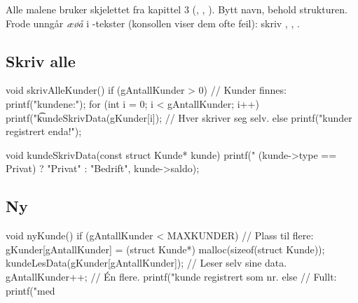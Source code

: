 

Alle malene bruker skjelettet fra kapittel 3 (, , ).
Bytt navn, behold strukturen. Frode unngår \emph{æøå} i -tekster (konsollen viser dem ofte feil): skriv , , .

\subsection{Skriv alle}\label{sec:skrivalle}
\begin{kode}
void skrivAlleKunder()  {
  if (gAntallKunder > 0)  {                        //  Kunder finnes:
     printf("\n\tAlle kundene:\n");
     for (int i = 0;  i < gAntallKunder;  i++)  {
         printf("\t%
         kundeSkrivData(gKunder[i]);                //  Hver skriver seg selv.
     }
  } else
     printf("\n\tIngen kunder registrert enda!\n");
}

void kundeSkrivData(const struct Kunde* kunde)  {
  printf("%
         (kunde->type == Privat) ? "Privat" : "Bedrift", kunde->saldo);
}
\end{kode}

\subsection{Ny}\label{sec:ny}
\begin{kode}
void nyKunde()  {
  if (gAntallKunder < MAXKUNDER)  {                //  Plass til flere:
     gKunder[gAntallKunder] = (struct Kunde*) malloc(sizeof(struct Kunde));
     kundeLesData(gKunder[gAntallKunder]);         //  Leser selv sine data.
     gAntallKunder++;                              //  Én flere.
     printf("\n\tNy kunde registrert som nr.%
  } else                                           //  Fullt:
     printf("\n\tFullt med %
}
\end{kode}

